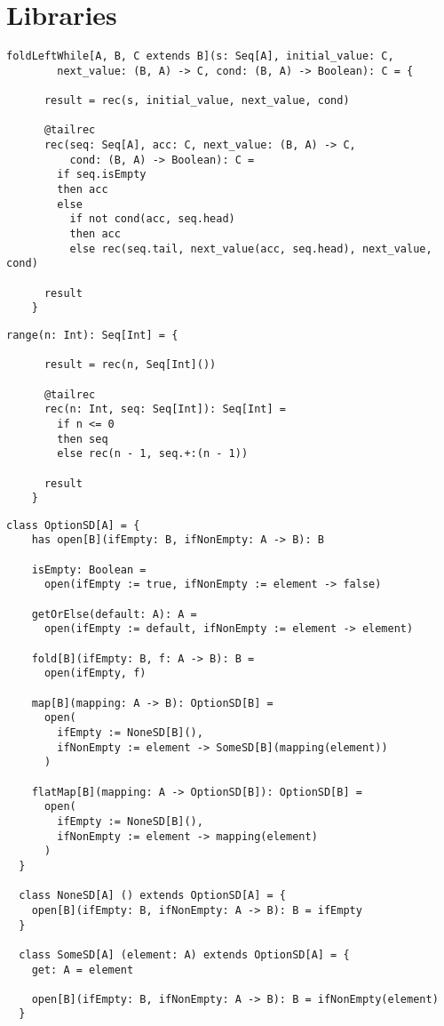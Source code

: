 \chapter{Libraries}

\begin{lstlisting}[label={lst:foldLeftWhile}]
    foldLeftWhile[A, B, C extends B](s: Seq[A], initial_value: C,
        next_value: (B, A) -> C, cond: (B, A) -> Boolean): C = {

      result = rec(s, initial_value, next_value, cond)

      @tailrec
      rec(seq: Seq[A], acc: C, next_value: (B, A) -> C,
          cond: (B, A) -> Boolean): C =
        if seq.isEmpty
        then acc
        else
          if not cond(acc, seq.head)
          then acc
          else rec(seq.tail, next_value(acc, seq.head), next_value, cond)

      result
    }
\end{lstlisting}

\begin{lstlisting}[label={lst:range}]
    range(n: Int): Seq[Int] = {

      result = rec(n, Seq[Int]())

      @tailrec
      rec(n: Int, seq: Seq[Int]): Seq[Int] =
        if n <= 0
        then seq
        else rec(n - 1, seq.+:(n - 1))

      result
    }
\end{lstlisting}


\begin{lstlisting}[label={lst:option}]
  class OptionSD[A] = {
    has open[B](ifEmpty: B, ifNonEmpty: A -> B): B

    isEmpty: Boolean =
      open(ifEmpty := true, ifNonEmpty := element -> false)

    getOrElse(default: A): A =
      open(ifEmpty := default, ifNonEmpty := element -> element)

    fold[B](ifEmpty: B, f: A -> B): B =
      open(ifEmpty, f)

    map[B](mapping: A -> B): OptionSD[B] =
      open(
        ifEmpty := NoneSD[B](),
        ifNonEmpty := element -> SomeSD[B](mapping(element))
      )

    flatMap[B](mapping: A -> OptionSD[B]): OptionSD[B] =
      open(
        ifEmpty := NoneSD[B](),
        ifNonEmpty := element -> mapping(element)
      )
  }

  class NoneSD[A] () extends OptionSD[A] = {
    open[B](ifEmpty: B, ifNonEmpty: A -> B): B = ifEmpty
  }

  class SomeSD[A] (element: A) extends OptionSD[A] = {
    get: A = element

    open[B](ifEmpty: B, ifNonEmpty: A -> B): B = ifNonEmpty(element)
  }
\end{lstlisting}

